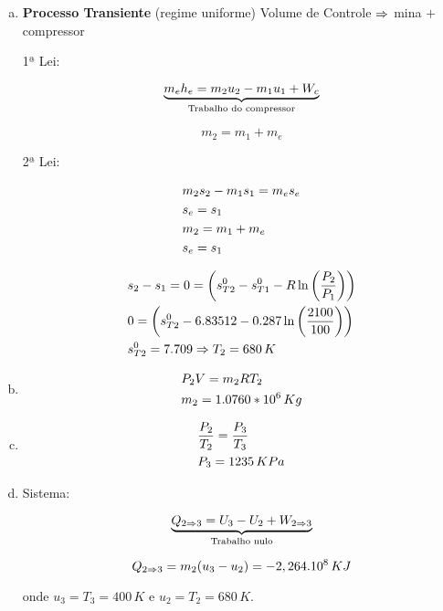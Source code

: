 \documentclass[a4paper,12pt]{memoir}
\begin{document}
\begin{sol}
\begin{enumerate}[a)]
 \item \textbf{Processo Transiente} (regime uniforme) Volume de Controle $\Rightarrow$ mina $+$ compressor

1ª Lei: 

\[
\underbrace {m_e h_e = m_2 u_2 - m_1 u_1 + W_c}_{\text{Trabalho do compressor}}
\]

\[
m_2 = m_1 + m_e
\]

2ª Lei:

\[
\begin{gathered}
  m_2 s_2 - m_1 s_1 = m_e s_e \hfill \\
  s_e = s_1 \hfill \\ 
  m_2 = m_1 + m_e \hfill \\ 
  s_e = s_1 \hfill \\ 
\end{gathered} 
\]

\[
\begin{gathered}
  s_2 - s_{1} = 0 = \left( s_{T2}^0 - s_{T1}^0 - R \ln \left( \frac{P_2}{P_1} \right) \right) \hfill \\
  0 = \left( s_{T2}^0 - 6.83512 - 0.287 \ln \left( \frac{2100}{100} \right) \right) \hfill \\ 
  s_{T2}^0 = 7.709 \imp T_2 = 680\,K \hfill \\ 
\end{gathered} 
\]

\item

\[
\begin{gathered}
  P_2 V = m_2 RT_2 \hfill \\
  m_2 = 1.0760*10^6\,Kg \hfill \\ 
\end{gathered} 
\]

\item

\[
\begin{gathered}
  \frac{P_2}{T_2} = \frac{P_3}{T_3} \hfill \\
  P_3 = 1235\,KPa \hfill \\ 
\end{gathered} 
\]

\item Sistema:

\[
\underbrace {Q_{2 \Rightarrow 3} = U_3 - U_2 + W_{2 \Rightarrow 3}}_{\text{Trabalho nulo}}
\]

\[
Q_{2 \Rightarrow 3} = m_2 (u_3 - u_2) = -2,264.10^8\,KJ
\]

\noindent onde $u_3 = T_3 = 400\,K$ e $u_2 = T_2 = 680\,K$.

\end{enumerate}
\end{sol}
\end{document}
